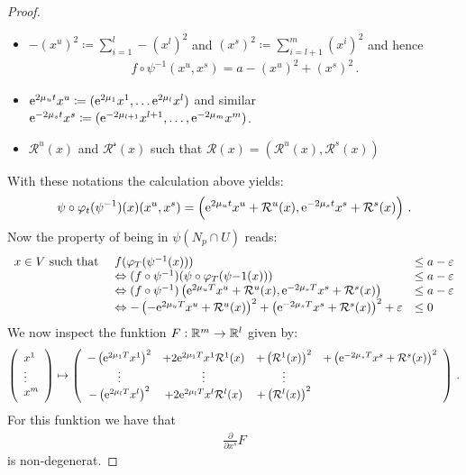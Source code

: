 \begin{proof}
\begin{itemize}
\item $-(x^{u})^2\coloneq \sum _{i=1}^l-(x^l)^2$ and $(x^{s})^2\coloneq \sum_{i=l+1}^m (x^i)^2$ and hence 
\begin{align*}
	f\circ\psi^{-1}(x^u,x^s)=a-(x^{u})^2+(x^{s})^2\, .
\end{align*} 
\item  $\mathrm{e}^{2\mu_u t}x^u\coloneq(\mathrm{e}^{2\mu_{1}}x^1,\dots \mathrm{e}^{2\mu_{l}}x^l)$ and similar $\mathrm{e}^{-2\mu_s t }x^s\coloneq (\mathrm{e}^{-2\mu_{l+1}}x^{l+1},\dots,\mathrm{e}^{-2\mu_{m}}x^m)$.
\item $\mathcal{R}^u(x)$ and $\mathcal{R^s}(x)$ such that $\mathcal{R}(x)=\left(\mathcal{R}^u(x),\mathcal{R}^s(x)\right)$
\end{itemize} With these notations the calculation above yields:
\begin{align*}
\psi\circ \varphi_t(\psi^{-1})(x)(x^u,x^s)=\left(\mathrm{e}^{2\mu_ut}x^u+\mathcal{R}^u(x),\mathrm{e}^{-2\mu_st}x^s+\mathcal{R}^s(x)\right)\, .
\end{align*}
Now the property of being in $\psi(N_p\cap U)$ reads:
\begin{align*}
	\begin{array}{lll}
		x\in V \text{ such that } & f(\varphi_T (\psi^{-1}(x))) & \leq a-\varepsilon \\
		&\Leftrightarrow (f\circ \psi^{-1})(\psi\circ \varphi_T (\psi{-1}(x)))& \leq a-\varepsilon \\
		&\Leftrightarrow  (f\circ \psi^{-1})\left(\mathrm{e}^{2\mu_uT}x^u+\mathcal{R}^u(x),\mathrm{e}^{-2\mu_sT}x^s+\mathcal{R}^s(x)\right)&\leq a-\varepsilon \\
		&\Leftrightarrow -\left(-\mathrm{e}^{2\mu_uT}x^u+\mathcal{R}^u(x)\right)^2    
		+\left(\mathrm{e}^{-2\mu_sT}x^s+\mathcal{R}^s(x)\right)^2+\varepsilon &\leq 0
	\end{array}
\end{align*} 
We now inspect the funktion $F:\mathbb{R}^m\to \mathbb{R}^l$ given by:
\begin{equation*}
\left(\begin{array}{l}
	x^1\\ \vdots \\x^m
\end{array}\right) \mapsto	\left(\begin{array}{cccc}
		-\left(\mathrm{e}^{2\mu_{1}T}x^{1}\right)^2&+2\mathrm{e}^{2\mu_{1}T}x^{1}\mathcal{R}^1(x)&+\left(\mathcal{R}^{1}(x)\right)^2&	+\left(\mathrm{e}^{-2\mu_sT}x^s+\mathcal{R}^s(x)\right)^2\\
		\vdots &\vdots&\vdots&\\ 
		-\left(\mathrm{e}^{2\mu_{l}T}x^{l}\right)^2&+2\mathrm{e}^{2\mu_{l}T}x^{l}\mathcal{R}^l(x)&+\left(\mathcal{R}^{l}(x)\right)^2&\\
	\end{array}\right)\, .
\end{equation*} For this funktion we have that 
\begin{align*}
\frac{\partial}{\partial x^s}F
\end{align*} is non-degenerat. 
\end{proof}


